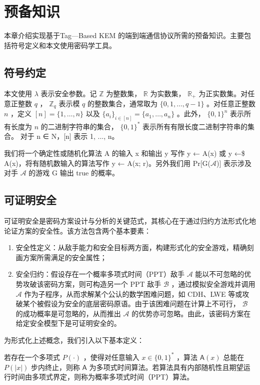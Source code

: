 \chapter{预备知识}\label{chap:preliminary}
本章介绍实现基于Tag—Based KEM 的端到端通信协议所需的预备知识。主要包括符号定义和本文使用密码学工具。
\section{符号约定}
\label{subsec:notation}

本文使用  $ \lambda $  表示安全参数。记  $ \mathbb{Z} $  为整数集， $ \mathbb{R} $  为实数集， $ \mathbb{R}_{+} $  为正实数集。对任意正整数  $ q $ ， $ \mathbb{Z}_q $  表示模  $ q $  的整数集合，通常取为  $ \{0, 1, \dots, q-1\} $ 。对任意正整数  $ n $ ，定义  $ [n] = \{1, \dots, n\} $  以及  $ \{a_i\}_{i \in [n]} = \{a_1, \dots, a_n\} $ 。此外， $ \{0,1\}^n $  表示所有长度为  $ n $  的二进制字符串的集合， $ \{0,1\}^* $  表示所有有限长度二进制字符串的集合。
对于 n ∈ N，[n] 表示 {1, ..., n}。

我们将一个确定性或随机化算法 A 的输入 x 和输出 y 写作 y ← A(x) 或 y ←\$ A(x)，将有随机数输入的算法写作 y ← A(x; r)。另外我们用 Pr[G($\mathcal{A}$)] 表示涉及对手 $\mathcal{A}$ 的游戏 G 输出 true 的概率。

\section{可证明安全}
可证明安全是密码方案设计与分析的关键范式，其核心在于通过归约方法形式化地论证方案的安全性。该方法包含两个基本要素：

\begin{enumerate}
    \item {安全性定义}：从敌手能力和安全目标两方面，构建形式化的安全游戏，精确刻画方案所需满足的安全属性；
    
    \item {安全归约}：假设存在一个概率多项式时间（PPT）敌手  $ \mathcal{A} $  能以不可忽略的优势攻破该密码方案，则可构造另一个 PPT 敌手  $ \mathcal{B} $ ，通过模拟安全游戏并调用  $ \mathcal{A} $  作为子程序，从而求解某个公认的数学困难问题，如 CDH、LWE 等或攻破某个被假设为安全的底层密码原语。由于该困难问题在计算上不可行， $ \mathcal{B} $  的成功概率是可忽略的，从而推出  $ \mathcal{A} $  的优势亦可忽略。由此，该密码方案在给定安全模型下是可证明安全的。
\end{enumerate}

为形式化上述概念，我们引入以下基本定义：

\begin{definition}[多项式时间算法]
若存在一个多项式  $ P(\cdot) $ ，使得对任意输入  $ x \in \{0,1\}^* $ ，算法  $ \mathsf{A}(x) $  总能在  $ P(|x|) $  步内终止，则称  $ \mathsf{A} $  为多项式时间算法。若算法具有内部随机性且期望运行时间由多项式界定，则称为概率多项式时间（PPT）算法。
\end{definition}

